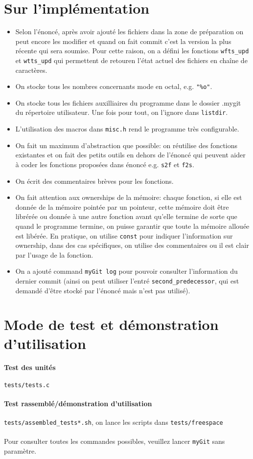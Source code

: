\documentclass{report}
\begin{document}
\section*{Sur l'implémentation}
\begin{itemize}
  \item Selon l'énoncé, après avoir ajouté les fichiers dans la zone de préparation on peut encore les modifier et quand on
  fait commit c'est la version la plus récente qui sera soumise. Pour cette raison, on a défini les
  fonctions \verb|wfts_upd| et \verb|wtts_upd| qui permettent de retouren l'état actuel des fichiers en chaîne de caractères.
  \item On stocke tous les nombres concernants mode en octal, e.g. \verb|"%o"|.
  \item On stocke tous les fichiers auxilliaires du programme dans le dossier .mygit
  du répertoire utilisateur. Une fois pour tout, on l'ignore dans \verb|listdir|.
  \item L'utilisation des macros dans \verb|misc.h| rend le programme très configurable.
  \item On fait un maximum d'abstraction que possible: on réutilise des fonctions existantes et
  on fait des petits outils en dehors de l'énoncé qui peuvent aider à coder les fonctions proposées dans énoncé e.g. \verb|s2f| et \verb|f2s|.
  \item On écrit des commentaires brèves pour les fonctions.
  \item On fait attention aux ownerships de la mémoire: chaque fonction, si elle est donnée de la mémoire pointée
  par un pointeur, cette mémoire doit être librérée ou donnée à une autre fonction avant qu'elle termine de sorte
  que quand le programme termine, on puisse garantir que toute la mémoire allouée est libérée. En pratique, on utilise
  \verb|const| pour indiquer l'information sur ownership, dans des cas spécifiques, on utilise des commentaires ou il est
  clair par l'usage de la fonction.
  \item On a ajouté command \verb|myGit log| pour pouvoir consulter l'information du dernier commit (ainsi on
  peut utiliser l'entré \verb|second_predecessor|, qui est demandé d'être stocké par l'énoncé mais n'est pas utilisé).
\end{itemize}

\section*{Mode de test et démonstration d'utilisation}

\paragraph{Test des unités} \verb|tests/tests.c|
\paragraph{Test rassemblé/démonstration d'utilisation}\verb|tests/assembled_tests*.sh|, 
on lance les scripts dans \verb|tests/freespace|

\paragraph{}Pour consulter toutes les commandes possibles, veuillez lancer \verb|myGit| sans paramètre.
\end{document}
